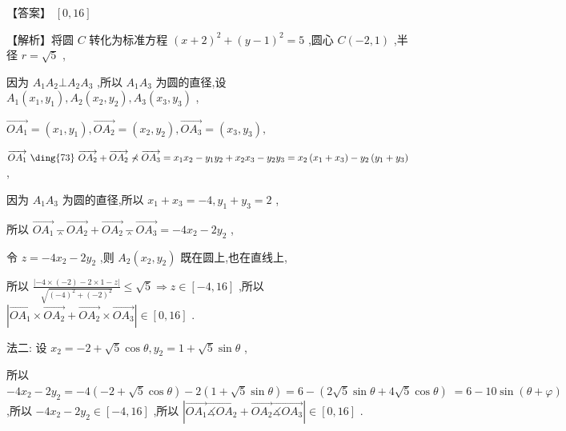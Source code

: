 \documentclass[10pt]{article}
\begin{document}
【答案】 \(\left\lbrack  {0,{16}}\right\rbrack\)

【解析】将圆 \(C\) 转化为标准方程 \({\left( x + 2\right) }^{2} + {\left( y - 1\right) }^{2} = 5\) ,圆心 \(C\left( {-2,1}\right)\) ,半径 \(r = \sqrt{5}\) ,

因为 \({A}_{1}{A}_{2} \bot  {A}_{2}{A}_{3}\) ,所以 \({A}_{1}{A}_{3}\) 为圆的直径,设 \({A}_{1}\left( {{x}_{1},{y}_{1}}\right) ,{A}_{2}\left( {{x}_{2},{y}_{2}}\right) ,{A}_{3}\left( {{x}_{3},{y}_{3}}\right)\) ,

\(\overrightarrow{O{A}_{1}} = \left( {{x}_{1},{y}_{1}}\right) ,\overrightarrow{O{A}_{2}} = \left( {{x}_{2},{y}_{2}}\right) ,\overrightarrow{O{A}_{3}} = \left( {{x}_{3},{y}_{3}}\right) ,\)

\(\overrightarrow{O{A}_{1}} \text{  \ding{73}  } \overrightarrow{O{A}_{2}} + \overrightarrow{O{A}_{2}} \nprec  \overrightarrow{O{A}_{3}} = {x}_{1}{x}_{2} - {y}_{1}{y}_{2} + {x}_{2}{x}_{3} - {y}_{2}{y}_{3} = {x}_{2}\left( {{x}_{1} + {x}_{3}}\right)  - {y}_{2}\left( {{y}_{1} + {y}_{3}}\right)\) ,

因为 \({A}_{1}{A}_{3}\) 为圆的直径,所以 \({x}_{1} + {x}_{3} =  - 4,{y}_{1} + {y}_{3} = 2\) ,

所以 \(\overrightarrow{O{A}_{1}} \barwedge  \overrightarrow{O{A}_{2}} + \overrightarrow{O{A}_{2}} \barwedge  \overrightarrow{O{A}_{3}} =  - 4{x}_{2} - 2{y}_{2}\) ,

令 \(z =  - 4{x}_{2} - 2{y}_{2}\) ,则 \({A}_{2}\left( {{x}_{2},{y}_{2}}\right)\) 既在圆上,也在直线上,

所以 \(\frac{\left| -4 \times  \left( -2\right)  - 2 \times  1 - z\right| }{\sqrt{{\left( -4\right) }^{2} + {\left( -2\right) }^{2}}} \leq  \sqrt{5} \Rightarrow  z \in  \left\lbrack  {-4,{16}}\right\rbrack\) ,所以 \(\left| {\overrightarrow{O{A}_{1}} \times  \overrightarrow{O{A}_{2}} + \overrightarrow{O{A}_{2}} \times  \overrightarrow{O{A}_{3}}}\right|  \in  \left\lbrack  {0,{16}}\right\rbrack\) .

法二: 设 \({x}_{2} =  - 2 + \sqrt{5}\cos \theta ,{y}_{2} = 1 + \sqrt{5}\sin \theta\) ,

所以 \(- 4{x}_{2} - 2{y}_{2} =  - 4\left( {-2 + \sqrt{5}\cos \theta }\right)  - 2\left( {1 + \sqrt{5}\sin \theta }\right)  = 6 - \left( {2\sqrt{5}\sin \theta  + 4\sqrt{5}\cos \theta }\right) \; = 6 - {10}\sin \left( {\theta  + \varphi }\right)\) ,所以 \(- 4{x}_{2} - 2{y}_{2} \in  \left\lbrack  {-4,{16}}\right\rbrack\) ,所以 \(\left| {\overrightarrow{O{A}_{1}}\overrightarrow{\measuredangle O{A}_{2}} + \overrightarrow{O{A}_{2}}\overrightarrow{\measuredangle O{A}_{3}}}\right|  \in  \left\lbrack  {0,{16}}\right\rbrack\) .
\end{document}

